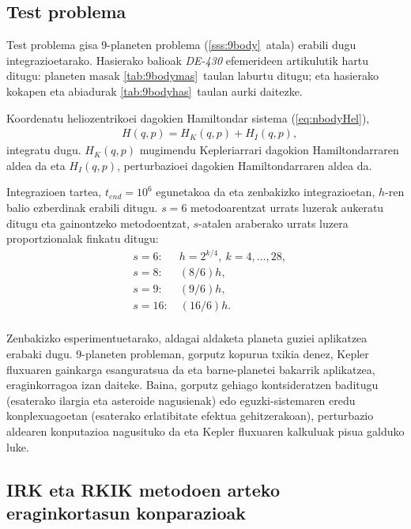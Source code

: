 \subsection{Test problema}


Test problema gisa 9-planeten problema (\ref{sss:9body}~atala) erabili dugu integrazioetarako. Hasierako balioak \emph{DE-430} efemerideen artikulutik hartu ditugu: planeten masak  \ref{tab:9bodymas}~taulan laburtu ditugu; eta hasierako kokapen eta abiadurak \ref{tab:9bodyhas}~taulan aurki daitezke.

Koordenatu heliozentrikoei dagokien  Hamiltondar sistema (\ref{eq:nbodyHel}),
\begin{align*}
&H(q,p)=H_K(q,p)+H_I(q,p),
\end{align*}
integratu dugu. $H_K(q,p)$ mugimendu Kepleriarrari dagokion Hamiltondarraren aldea da  eta $H_I(q,p)$, perturbazioei dagokien Hamiltondarraren aldea da.

Integrazioen tartea, $t_{end}=10^6$ egunetakoa da eta zenbakizko integrazioetan, $h$-ren balio ezberdinak erabili ditugu. $s=6$ metodoarentzat urrats luzerak aukeratu ditugu eta gainontzeko metodoentzat, $s$-atalen araberako urrats luzera proportzionalak finkatu ditugu:
\begin{align*}
&s=6: \quad  \ \ h=2^{k/4}, \ k=4,\dots,28, \\
&s=8: \quad  \ \ (8/6)h, \\
&s=9: \quad  \ \ (9/6)h, \\
&s=16: \quad (16/6)h. \\
\end{align*}

Zenbakizko esperimentuetarako, aldagai aldaketa planeta guziei aplikatzea erabaki dugu. $9$-planeten probleman, gorputz kopurua txikia denez,  Kepler fluxuaren gainkarga esanguratsua da eta  barne-planetei bakarrik aplikatzea, eraginkorragoa izan daiteke. Baina, gorputz gehiago kontsideratzen baditugu (esaterako ilargia eta asteroide nagusienak) edo eguzki-sistemaren eredu konplexuagoetan (esaterako erlatibitate efektua gehitzerakoan), perturbazio aldearen konputazioa nagusituko da eta Kepler fluxuaren kalkuluak pisua galduko luke.


\subsection*{IRK eta RKIK metodoen arteko eraginkortasun konparazioak}

